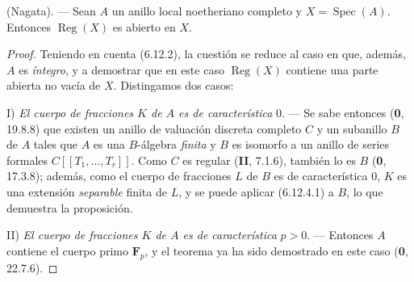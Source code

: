 \begin{theorem}[6.12.7]
\label{IV.2.s6.12.7-fr}
\textnormal{(Nagata).} --- Sean $A$ un anillo local noetheriano completo y
$X=\operatorname{Spec}(A)$. Entonces $\operatorname{Reg}(X)$ es abierto en
$X$.
\end{theorem}

\begin{proof}
Teniendo en cuenta (6.12.2), la cuestión se reduce al caso en que, además,
$A$ es \emph{íntegro}, y a demostrar que en este caso $\operatorname{Reg}(X)$
contiene una parte abierta no vacía de $X$. Distingamos dos casos:

I) \emph{El cuerpo de fracciones $K$ de $A$ es de característica} 0. --- Se sabe
entonces (\textbf 0, 19.8.8) que existen un anillo de valuación discreta completo
$C$ y un subanillo $B$ de $A$ tales que $A$ es una $B$-álgebra \emph{finita} y
$B$ es isomorfo a un anillo de series formales
$C[[T_1,\ldots,T_r]]$. Como $C$ es regular (\textbf{II}, 7.1.6), también lo es
$B$ (\textbf 0, 17.3.8); además, como el cuerpo de fracciones $L$ de $B$ es de
característica 0, $K$ es una extensión \emph{separable} finita de $L$, y se puede
aplicar (6.12.4.1) a $B$, lo que demuestra la proposición.

II) \emph{El cuerpo de fracciones $K$ de $A$ es de característica} $p>0$. ---
Entonces $A$ contiene el cuerpo primo $\mathbf F_p$, y el teorema ya ha
sido demostrado en este caso (\textbf 0, 22.7.6).
\end{proof}
